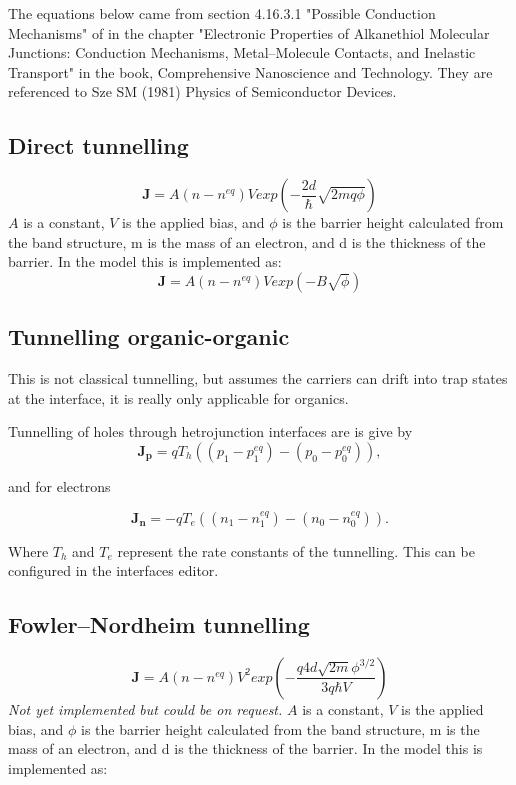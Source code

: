 The equations below came from section 4.16.3.1 "Possible Conduction Mechanisms" of in the chapter "Electronic Properties of Alkanethiol Molecular Junctions: Conduction Mechanisms, Metal–Molecule Contacts, and Inelastic Transport" in the book, Comprehensive Nanoscience and Technology. They are referenced to Sze SM (1981) Physics of Semiconductor Devices.

\subsection{Direct tunnelling}
\begin{equation}
\boldsymbol{J} = A(n-n^{eq}) Vexp  \left( -\frac{2d}{\hbar} \sqrt{2m q\phi}  \right)
\end{equation}
$A$ is a constant, $V$ is the applied bias, and $\phi$ is the barrier height calculated from the band structure, m is the mass of an electron, and d is the thickness of the barrier. In the model this is implemented as:
\begin{equation}
\boldsymbol{J} = A(n-n^{eq}) Vexp  \left( -B \sqrt{\phi}  \right)
\end{equation}

\subsection{Tunnelling organic-organic}
This is not classical tunnelling, but assumes the carriers can drift into trap states at the interface, it is really only applicable for organics.

Tunnelling of holes through hetrojunction interfaces are is give by
\begin{equation}
\boldsymbol{J_p} = q T_{h}  ((p_{1}-p_{1}^{eq})-(p_{0}-p_{0}^{eq})),
\end{equation}

and for electrons

\begin{equation}
\boldsymbol{J_n} = -q T_{e}  ((n_{1}-n_{1}^{eq})-(n_{0}-n_{0}^{eq})).
\end{equation}

Where $T_{h}$ and $T_{e}$ represent the rate constants of the tunnelling. This can be configured in the interfaces editor.

\subsection{Fowler–Nordheim tunnelling}
\begin{equation}
\boldsymbol{J} = A(n-n^{eq}) V^2 exp  \left( -\frac{q4d\sqrt{2m} \phi^{3/2}}{3q \hbar V}  \right)
\end{equation}
\emph{Not yet implemented but could be on request.} $A$ is a constant, $V$ is the applied bias, and $\phi$ is the barrier height calculated from the band structure, m is the mass of an electron, and d is the thickness of the barrier.  In the model this is implemented as:

